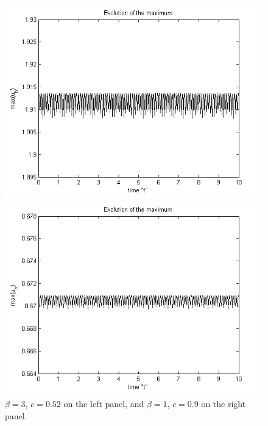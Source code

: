 \documentclass[11pt,a4paper,twoside]{article}
\begin{document}
\begin{figure}[!htbp]
	\centering
	\begin{minipage}[b]{0.35\linewidth}
		\includegraphics[width=\linewidth]{Pictures/EvolutionOfMaximum_bt3.png}
	\end{minipage}	
	\begin{minipage}[b]{0.35\linewidth}
		 \includegraphics[width=\linewidth]{Pictures/EvolutionOfMaximum_bt1.png}
	\end{minipage}

	\caption{$\beta = 3$, $c=0.52$ on the left panel, and $\beta = 1$, $c=0.9$ on the right panel.}
	\label{fig:solMax}
\end{figure}
\end{document}
